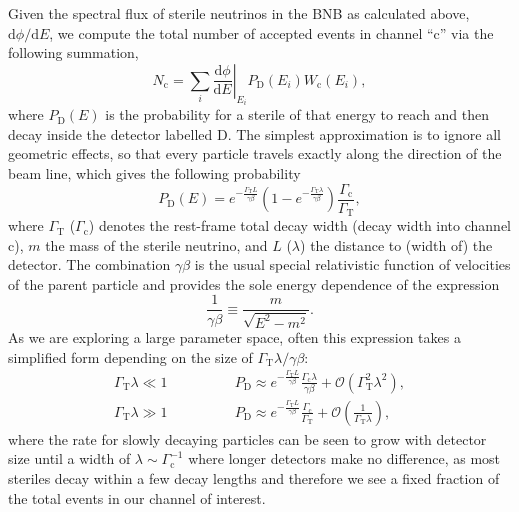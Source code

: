 \documentclass[11pt, a4paper]{article}
\begin{document}
\begin{figure}[t]
\center

\end{figure}

Given the spectral flux of sterile neutrinos in the BNB as calculated above, $\mathrm{d}\phi/\mathrm{d}E$, we compute the total number of accepted events in channel ``$\text{c}$'' via the following summation,
%
\[ N_\text{c} = \sum_{i} \left .
\frac{\mathrm{d}\phi}{\mathrm{d}E}\right|_{E_i} P_\text{D}\left(E_i\right)
W_\text{c}\left(E_i\right),  \]
%
where $P_\text{D}(E)$ is the probability for a sterile of that energy to reach
and then decay inside the detector labelled $\text{D}$. The simplest
approximation is to ignore all geometric effects, so that every particle
travels exactly along the direction of the beam line, which gives the following
probability 
%
\[ P_\text{D}\left(E\right) = e^{-\frac{\Gamma_\text{T}L}{\gamma\beta}}\left(
1-
e^{-\frac{\Gamma_\text{T}\lambda}{\gamma\beta}}\right)\frac{\Gamma_\text{c}}{\Gamma_\text{T}},
\label{eq:prob}
\]
%
where $\Gamma_\text{T}$ ($\Gamma_\text{c}$) denotes the rest-frame total decay
width (decay width into channel $\text{c}$), $m$ the mass of the sterile
neutrino, and $L$ ($\lambda$) the distance to (width of) the detector. The
combination $\gamma\beta$ is the usual special relativistic function of
velocities of the parent particle and provides the sole energy dependence of
the expression
%
\[   \frac{1}{\gamma\beta} \equiv \frac{m}{\sqrt{E^2-m^2}}. \]
%
As we are exploring a large parameter space, often this expression takes a
simplified form depending on the size of $\Gamma_\text{T}\lambda/\gamma\beta$:
%
\begin{align*} 
%
\Gamma_\text{T}\lambda \ll 1\qquad&\qquad P_\text{D} \approx
e^{-\frac{\Gamma_\text{T}L}{\gamma\beta}}\frac{\Gamma_\text{c}\lambda}{\gamma\beta}
+ \mathcal{O}\left(\Gamma_\text{T}^2\lambda^2\right),\\ 
%
\Gamma_\text{T}\lambda \gg 1\qquad&\qquad P_\text{D} \approx
e^{-\frac{\Gamma_\text{T}L}{\gamma\beta}}\frac{\Gamma_\text{c}}{\Gamma_\text{T}}
+ \mathcal{O}\left(\frac{1}{\Gamma_\text{T}\lambda}\right), 
%
\end{align*}
%
where the rate for slowly decaying particles can be seen to grow with detector
size until a width of $\lambda\sim\Gamma_\text{c}^{-1}$ where longer detectors
make no difference, as most steriles decay within a few decay lengths and
therefore we see a fixed fraction of the total events in our channel of interest. 
\end{document}
